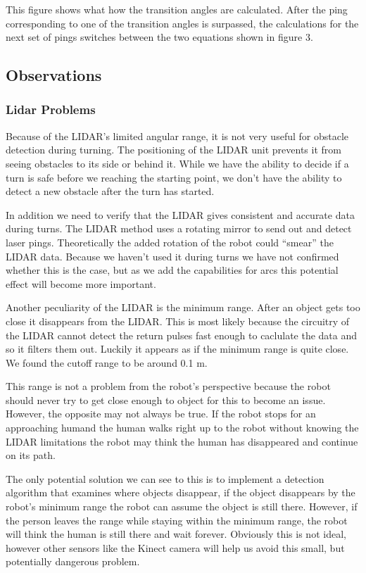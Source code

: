 This figure shows what how the transition angles are calculated.
After the ping corresponding to one of the transition angles is surpassed,
the calculations for the next set of pings switches between the two
equations shown in figure 3.

\subsection{Observations}

\subsubsection{Lidar Problems}
Because of the LIDAR's limited angular range, it is not very useful
for obstacle detection during turning.  The positioning of the LIDAR
unit prevents it from seeing obstacles to its side or behind it. While
we have the ability to decide if a turn is safe before we reaching the
starting point, we don't
have the ability to detect a new obstacle after the turn has started.

In addition we need to verify that the LIDAR gives consistent and
accurate data during turns.  The LIDAR method uses a rotating mirror
to send out and detect laser pings.\cite{deyle_sick_2008}
Theoretically the added rotation of the robot could ``smear'' the
LIDAR data.  Because we haven't used it during turns we have not
confirmed whether this is the case, but as we add the capabilities for
arcs this potential effect will become more important.

Another peculiarity of the LIDAR is the minimum range.  After an
object gets too close it disappears from the LIDAR.  This is most
likely because the circuitry of the LIDAR cannot detect the return
pulses fast enough to caclulate the data and so it filters them out.
Luckily it appears as if the minimum range is quite close. We found
the cutoff range to be around 0.1 m.

This range is not a problem from the robot's perspective because the
robot should never try to get close enough to object for this to
become an issue.  However, the opposite may not always be true. If the
robot stops for an approaching humand the human walks right up to the
robot without knowing the LIDAR limitations the robot may think the
human has disappeared and continue on its path.

The only potential solution we can see to this is to implement a
detection algorithm that examines where objects disappear, if the
object disappears by the robot's minimum range the robot can assume
the object is still there.  However, if the person leaves the range
while staying within the minimum range, the robot will think the human
is still there and wait forever. Obviously this is not ideal, however
other sensors like the Kinect camera will help us avoid this small, but potentially dangerous problem.

